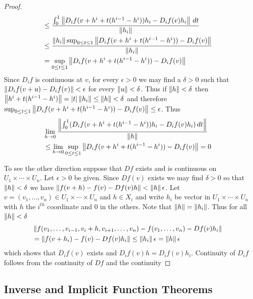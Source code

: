 \begin{proof}
\begin{align*}
&\leq \frac{\int_0^1 \left \lVert  D_i f(v+h^i + t(h^{i-1}-h^i)) h_i - D_i f (v) h_i  \right \rVert\, dt}{\left \lVert h_i \right \rVert} \\
&\leq \frac{\left \lVert h_i \right \rVert \sup_{0 \leq t \leq 1} \left \lVert  D_i f(v+h^i + t(h^{i-1}-h^i)) - D_i f (v)  \right \rVert}{\left \lVert h_i \right \rVert} \\
&=  \sup_{0 \leq t \leq 1} \left \lVert  D_i f(v+h^i + t(h^{i-1}-h^i)) - D_i f (v)  \right \rVert\\
\end{align*}
Since $D_i f$ is continuous at $v$, for every $\epsilon > 0$ we may find a $\delta > 0$ such that $\left \lVert D_i f(v + u) - D_i f(v) \right \rVert < \epsilon$ for every $\left \lVert u \right \rVert < \delta$.  Thus if $\left \lVert h \right \rVert < \delta$ then $\left \lVert h^i + t(h^{i-1}-h^i) \right \rVert = \left \vert t \right \vert \left \lVert h_i \right \rVert \leq \left \lVert h \right \rVert < \delta$ and therefore $\sup_{0 \leq t \leq 1} \left \lVert  D_i f(v+h^i + t(h^{i-1}-h^i)) - D_i f (v)  \right \rVert\leq \epsilon$.  Thus 
\begin{align*}
&\lim_{h \to 0} \frac{\left \lVert \int_0^1 (D_i f(v+h^i + t(h^{i-1}-h^i)) h_i - D_i f (v) h_i )\, dt \right \rVert}{\left \lVert h \right \rVert} \\
&\leq \lim_{h \to 0} \sup_{0 \leq t \leq 1} \left \lVert  D_i f(v+h^i + t(h^{i-1}-h^i)) - D_i f (v)  \right \rVert= 0
\end{align*}

To see the other direction suppose that $Df$ exists and is continuous on $U_1 \times \dotsb \times U_n$.  Let $\epsilon > 0$ be given.  Since $Df(v)$ exists we may find $\delta > 0$ so that $\left \lVert h \right \rVert < \delta$ we have $\left \lVert f(v+h) - f(v) - Df(v) h \right \rVert < \left \lVert h \right \rVert \epsilon$.   Let $v=(v_1, \dotsc, v_n) \in U_1 \times \dotsb \times U_n$ and $h \in X_i$ and write $h_i$ be vector in $U_1 \times \dotsb \times U_n$ with $h$ the $i^{th}$ coordinate and $0$ in the others.   Note that $\left \lVert h \right \rVert = \left \lVert h_i \right \rVert$.  Thus for all $\left \lVert h \right \rVert < \delta$
\begin{align*}
&\left \lVert f(v_1, \dotsc, v_{i-1}, v_i+h, v_{i+1}, \dotsc, v_n) - f(v_1, \dotsc, v_n) - Df(v) h_i \right \rVert \\
&= \left \lVert f(v + h_i) - f(v) - Df(v) h_i \right \rVert \leq \left \lVert h_i \right \rVert \epsilon = \left \lVert h \right \rVert \epsilon
\end{align*}
which shows that $D_i f(v)$ exists and $D_i f(v) h = D_i f(v) h_i$.  Continuity of $D_i f$ follows from the continuity of $Df$ and the continuity 
\end{proof}

\subsection{Inverse and Implicit Function Theorems}

